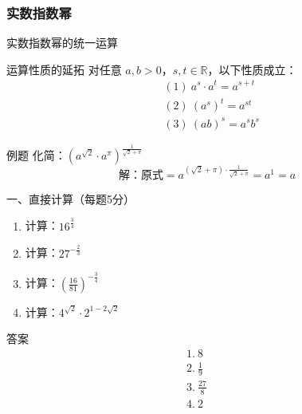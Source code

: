 

\subsubsection{实数指数幂}
\begin{frame}{实数指数幂的统一运算}
    \begin{block}{运算性质的延拓}
        对任意 \( a, b > 0 \)，\( s, t \in \mathbb{R} \)，以下性质成立：
        \[
        \begin{aligned}
        &(1)\ a^s \cdot a^t = a^{s+t} \\
        &(2)\ (a^s)^t = a^{st} \\
        &(3)\ (ab)^s = a^s b^s
        \end{aligned}
        \]
    \end{block}

    \begin{exampleblock}{例题}
        化简：\( (a^{\sqrt{2}} \cdot a^{\pi})^{\frac{1}{\sqrt{2}+\pi}} \)
        \[
        \text{解：原式} = a^{(\sqrt{2}+\pi)\cdot \frac{1}{\sqrt{2}+\pi}}  = a^1 = a
        \]
    \end{exampleblock}
\end{frame}


\begin{frame}{一、直接计算（每题5分）}
    \begin{enumerate}
        \item 计算：\( 16^{\frac{3}{4}} \)
        \item 计算：\( 27^{-\frac{2}{3}} \)
        \item 计算：\( \left( \frac{16}{81} \right)^{-\frac{3}{4}} \)
        \item 计算：\( 4^{\sqrt{2}} \cdot 2^{1-2\sqrt{2}} \)
    \end{enumerate}
    
    \pause %
    \begin{block}{答案}
        \[
        \begin{aligned}
        &1.\ 8 \quad \quad \quad \\
        &2.\ \frac{1}{9} \\
        &3.\ \frac{27}{8} \quad \\
        & 4.\ 2
        \end{aligned}
        \]
    \end{block}
\end{frame}








